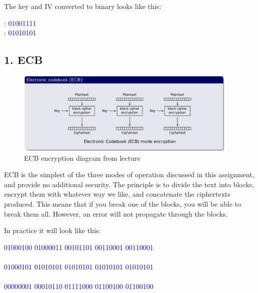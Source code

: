 \documentclass{article}
\begin{document}
The key and IV converted to binary looks like this: 
\begin{tcolorbox}
\begin{center}
\textcolor{blue}{
: 01001111\\
: 01010101}
\end{center}
\end{tcolorbox}



\newpage
\subsection{1. ECB}

\begin{figure}[H]
 \centering
  \includegraphics[width=300pt]{img/ecbLecture.png}
 \caption{ECB encryption diagram from lecture}
 \end{figure}


ECB is the simplest of the three modes of operation discussed in this assignment, and provide no additional security. The principle is to divide the text into blocks, encrypt them with whatever way we like, and concatenate the ciphertexts produced. This means that if you break one of the blocks, you will be able to break them all. However, an error will not propagate through the blocks. 

In practice it will look like this:

\begin{scriptsize}
\begin{tcolorbox}
\begin{center}
\textcolor{blue}{
 01000100 01000011 00101101 00110001 00110001\\
\qquad  {}\qquad  {}\qquad  {}\\
01000101 01010101 01010101 01010101 01010101\\
\makebox[1.5cm]{\textbf{=}}\\
00000001 00010110 01111000 01100100 01100100
}

\end{center}
\end{tcolorbox}
\end{scriptsize}
\end{document}
